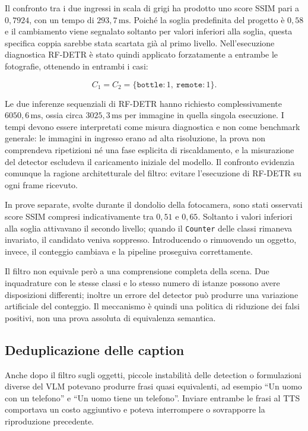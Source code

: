 Il confronto tra i due ingressi in scala di grigi ha prodotto uno score SSIM
pari a \(0{,}7924\), con un tempo di \(293{,}7\,\mathrm{ms}\). Poiché la soglia
predefinita del progetto è \(0{,}58\) e il cambiamento viene segnalato soltanto
per valori inferiori alla soglia, questa specifica coppia sarebbe stata
scartata già al primo livello. Nell'esecuzione diagnostica RF-DETR è stato
quindi applicato forzatamente a entrambe le fotografie, ottenendo in entrambi
i casi:

\begin{equation}
    C_1 = C_2 =
    \{\texttt{bottle}: 1,\ \texttt{remote}: 1\}.
    \label{eq:counter-test-ssim-rfdetr}
\end{equation}

Le due inferenze sequenziali di RF-DETR hanno richiesto complessivamente
\(6050{,}6\,\mathrm{ms}\), ossia circa \(3025{,}3\,\mathrm{ms}\) per immagine
in quella singola esecuzione. I tempi devono essere interpretati come misura
diagnostica e non come benchmark generale: le immagini in ingresso erano ad
alta risoluzione, la prova non comprendeva ripetizioni né una fase esplicita
di riscaldamento, e la misurazione del detector escludeva il caricamento
iniziale del modello. Il confronto evidenzia comunque la ragione
architetturale del filtro: evitare l'esecuzione di RF-DETR su ogni frame
ricevuto.

In prove separate, svolte durante il dondolio della fotocamera, sono stati
osservati score SSIM compresi indicativamente tra \(0{,}51\) e \(0{,}65\).
Soltanto i valori inferiori alla soglia attivavano il secondo livello; quando
il \texttt{Counter} delle classi rimaneva invariato, il candidato veniva
soppresso. Introducendo o rimuovendo un oggetto, invece, il conteggio cambiava
e la pipeline proseguiva correttamente.

Il filtro non equivale però a una comprensione completa della scena. Due
inquadrature con le stesse classi e lo stesso numero di istanze possono avere
disposizioni differenti; inoltre un errore del detector può produrre una
variazione artificiale del conteggio. Il meccanismo è quindi una politica di
riduzione dei falsi positivi, non una prova assoluta di equivalenza semantica.

\subsection{Deduplicazione delle caption}
\label{subsec:problemi-deduplicazione}

Anche dopo il filtro sugli oggetti, piccole instabilità delle detection o
formulazioni diverse del VLM potevano produrre frasi quasi equivalenti, ad
esempio ``Un uomo con un telefono'' e ``Un uomo tiene un telefono''. Inviare
entrambe le frasi al TTS comportava un costo aggiuntivo e poteva interrompere
o sovrapporre la riproduzione precedente.

